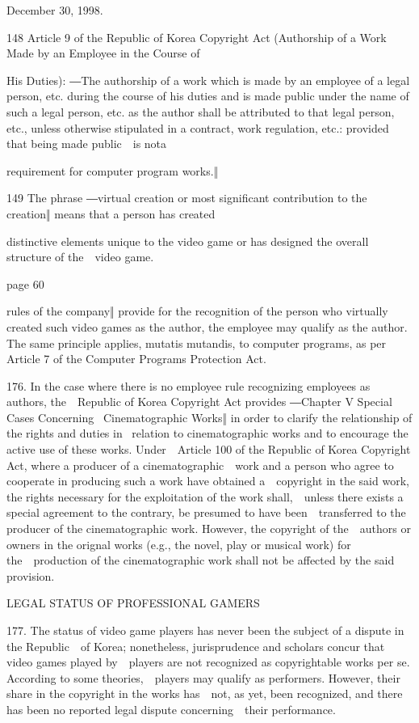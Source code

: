 \documentclass[
]{article}
\begin{document}
{December 30, 1998.}

{148 }{Article 9 of the Republic of Korea }{Copyright Act (Authorship of
a Work Made by an Employee in the Course of}

{His Duties)}{: ―}{The authorship of a work which is made by an employee
of a legal person, etc. during the course of his duties and is made
public under the name of such a legal person, etc. as the author shall
be attributed to that legal person, etc., unless otherwise stipulated in
a contract, work regulation, etc.: provided that being made public~~is
nota}

{requirement for computer program works.}{‖}

{149 }{The phrase }{―virtual creation or most significant contribution
to }{the }{creation‖ mean}{s that a person has created}

{distinctive elements unique to the video game or has designed the
overall structure of the~~video game.}

{page 60}

{rules of the company‖ provide for the recognition of the person who
virtually created such }{video games as the author, the employee may
qualify as the author. The same principle applies, }{mutatis mutandis}{,
to computer programs, as per Article 7 of the }{Computer Programs
Protection Act}{.}

{176. }{In the case where there is no employee rule recognizing
employees as authors, the~~Republic of Korea }{Copyright Act }{provides
―Chapter }{V Special Cases Concerning }{~Cinematographic Works‖ in order
to clarify the relationship of the rights and duties in }{~relation to
cinematographic works and to encourage the active use of these works.
Under~~Article 100 of the Republic of Korea }{Copyright Act}{, where a
producer of a cinematographic~~work and a person who agree to cooperate
in producing such a work have obtained a~~copyright in the said work,
the rights necessary for the exploitation of the work shall,~~unless
there exists a special agreement to the contrary, be presumed to have
been~~transferred to the producer of the cinematographic work. However,
the copyright of the~~authors or owners in the orignal works (e.g., the
novel, play or musical work) for the~~production of the cinematographic
work shall not be affected by the said provision.}

{LEGAL STATUS OF PROFESSIONAL GAMERS}

{177. }{The status of video game players has never been the subject of a
dispute in the Republic~~of Korea; nonetheless, jurisprudence and
scholars concur that video games played by~~players are not recognized
as copyrightable works }{per se}{. According to some theories,~~players
may qualify as performers. However, their share in the copyright in the
works has~~not, as yet, been recognized, and there has been no reported
legal dispute concerning~~their performance.}
\end{document}

